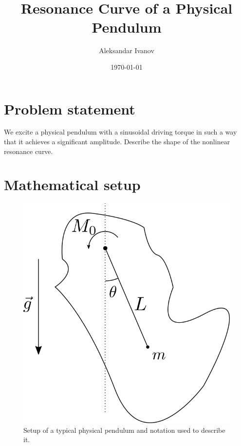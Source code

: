 \documentclass[10pt,a4paper,twocolumn]{article}
\begin{document}
\title{Resonance Curve of a Physical Pendulum}
\author{Aleksandar Ivanov}
\date{\today}
\maketitle

\section{Problem statement}

We excite a physical pendulum with a sinusoidal driving torque in such a way that it achieves a significant amplitude. Describe the shape of the nonlinear resonance curve.

\section{Mathematical setup}

\begin{figure}[h]
\centering
\captionsetup{justification=centering}
\includegraphics[scale=0.7]{pendulum.png}
\caption{Setup of a typical physical pendulum and notation used to describe it.}
\label{fig:setup}
\end{figure}
\end{document}
